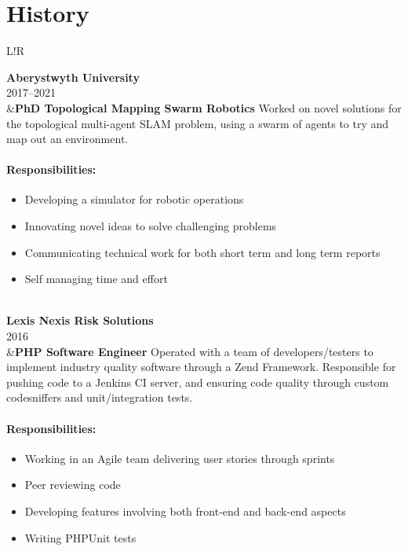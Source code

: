\documentclass[10pt]{article}
\newcommand\VRule{\color{lightgray}\vrule width 0.5pt}
\begin{document}
\section*{History}
\begin{longtable}{L!{\VRule}R}

{\bf Aberystwyth University}\\
2017--2021\\
&{\bf PhD Topological Mapping Swarm Robotics}\newline
Worked on novel solutions for the topological multi-agent SLAM problem, using a swarm of agents to try and map out an environment.

\vspace{-3mm}
\paragraph{Responsibilities:}
\begin{itemize}[noitemsep,topsep=0pt]
	\item Developing a simulator for robotic operations
	\item Innovating novel ideas to solve challenging problems
	\item Communicating technical work for both short term and long term reports
	\item Self managing time and effort
\end{itemize}
\\

{\bf Lexis Nexis Risk Solutions}\\
2016\\
&{\bf PHP Software Engineer}\newline
Operated with a team of developers/testers to implement industry quality software through a Zend Framework. Responsible for pushing code to a Jenkins CI server, and ensuring code quality through custom codesniffers and unit/integration tests.

\vspace{-3mm}
\paragraph{Responsibilities:}
\begin{itemize}[noitemsep,topsep=0pt]
    \item Working in an Agile team delivering user stories through sprints
    \item Peer reviewing code
    \item Developing features involving both front-end and back-end aspects
    \item Writing PHPUnit tests
\end{itemize}
\\


\end{longtable}
\end{document}
